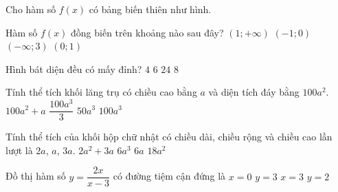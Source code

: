 \begin{ex}%
Cho hàm số $f(x)$ có bảng biến thiên như hình.
\begin{center}
\end{center}
 Hàm số $f(x)$ đồng biến trên khoảng nào sau đây?
\choice
{$(1;+\infty)$}
{$(-1;0)$}
{$(-\infty;3)$}
{\True $(0;1)$}
\end{ex}
\begin{ex}%
Hình bát diện đều có mấy đỉnh?
\choice
{$4$}
{\True $6$}
{$24$}
{$8$}
\end{ex}
\begin{ex}%
Tính thể tích khối lăng trụ có chiều cao bằng $a$ và diện tích đáy bằng $100a^2$.
\choice
{$100a^2+a$}
{$\dfrac{100a^3}{3}$}
{$50a^3$}
{\True $100a^3$}
\end{ex}
\begin{ex}%
Tính thể tích của khối hộp chữ nhật có chiều dài, chiều rộng và chiều cao lần lượt là $2a$, $a$, $3a$.
\choice
{$2a^2+3a$}
{\True $6a^3$}
{$6a$}
{$18a^2$}
\end{ex}
\begin{ex}%
Đồ thị hàm số $y=\dfrac{2x}{x-3}$ có đường tiệm cận đứng là
\choice
{$x=0$}
{$y=3$}
{\True $x=3$}
{$y=2$}
\end{ex}
